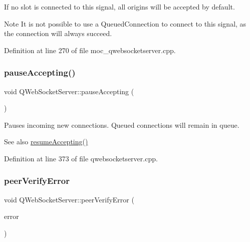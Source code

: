 If no slot is connected to this signal, all origins will be accepted by default.

\begin{DoxyNote}{Note}
It is not possible to use a Queued\+Connection to connect to this signal, as the connection will always succeed. 
\end{DoxyNote}


Definition at line 270 of file moc\+\_\+qwebsocketserver.\+cpp.

\mbox{\label{class_q_web_socket_server_abebb5c4066427590c3d4aacecfe51567}} 
\subsubsection{\texorpdfstring{pause\+Accepting()}{pauseAccepting()}}
{\footnotesize\ttfamily void Q\+Web\+Socket\+Server\+::pause\+Accepting (\begin{DoxyParamCaption}{ }\end{DoxyParamCaption})}

Pauses incoming new connections. Queued connections will remain in queue. \begin{DoxySeeAlso}{See also}
\mbox{\hyperlink{class_q_web_socket_server_abd60e2bf5ca8e58e15ff3ac061af85ba}{resume\+Accepting()}} 
\end{DoxySeeAlso}


Definition at line 373 of file qwebsocketserver.\+cpp.

\mbox{\label{class_q_web_socket_server_aa80990116026e853dee6aefcf728bf45}} 
\subsubsection{\texorpdfstring{peer\+Verify\+Error}{peerVerifyError}}
{\footnotesize\ttfamily void Q\+Web\+Socket\+Server\+::peer\+Verify\+Error (\begin{DoxyParamCaption}\item[{const Q\+Ssl\+Error \&}]{error }\end{DoxyParamCaption})\hspace{0.3cm}{\ttfamily [signal]}}

